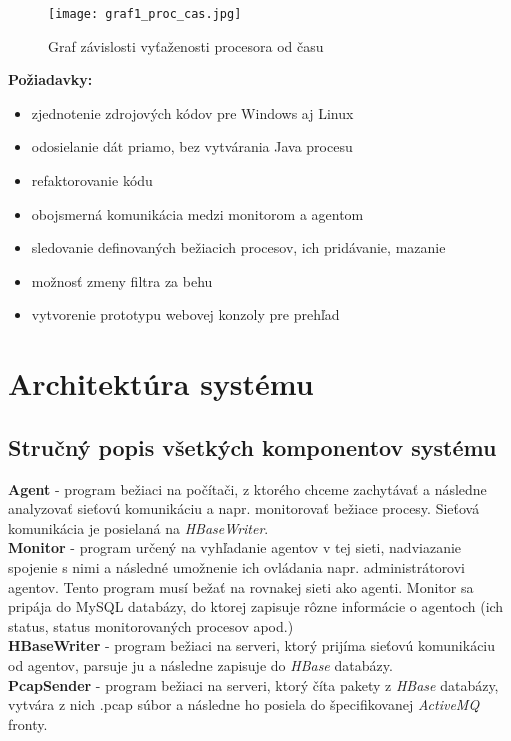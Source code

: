 \documentclass[a4paper,12pt]{article}
\begin{document}
\begin{figure}[h!]
	\centering
	\label{graf1}
	\texttt{[image: graf1\_proc\_cas.jpg]}
	\caption{Graf závislosti vyťaženosti procesora od času}
\end{figure}
\newpage

\noindent \textbf{Požiadavky: }
\begin{itemize} 
	\item zjednotenie zdrojových kódov pre Windows aj Linux
	\item odosielanie dát priamo, bez vytvárania Java procesu
	\item refaktorovanie kódu
	\item obojsmerná komunikácia medzi monitorom a agentom
	\item sledovanie definovaných bežiacich procesov, ich pridávanie, mazanie
	\item možnosť zmeny filtra za behu
	\item vytvorenie prototypu webovej konzoly pre prehľad \\
\end{itemize}
\newpage

\section{Architektúra systému}
\subsection{Stručný popis všetkých komponentov systému}
\textbf{Agent} - program bežiaci na počítači, z ktorého chceme zachytávať a následne analyzovať sieťovú komunikáciu a napr. monitorovať bežiace procesy. Sieťová komunikácia je posielaná na \textit{HBaseWriter}. \\

\noindent \textbf{Monitor} - program určený na vyhľadanie agentov v tej sieti, nadviazanie spojenie s nimi a následné umožnenie ich ovládania napr. administrátorovi agentov. Tento program musí bežať na rovnakej sieti ako agenti. Monitor sa pripája do MySQL databázy, do ktorej zapisuje rôzne informácie o agentoch (ich status, status monitorovaných procesov apod.) \\

\noindent \textbf{HBaseWriter} - program bežiaci na serveri, ktorý prijíma sieťovú komunikáciu od agentov, parsuje ju a následne zapisuje do \textit{HBase} databázy. \\

\noindent \textbf{PcapSender} - program bežiaci na serveri, ktorý číta pakety z \textit{HBase} databázy, vytvára z nich .pcap súbor a následne ho posiela do špecifikovanej \textit{ActiveMQ} fronty. \\
\end{document}
